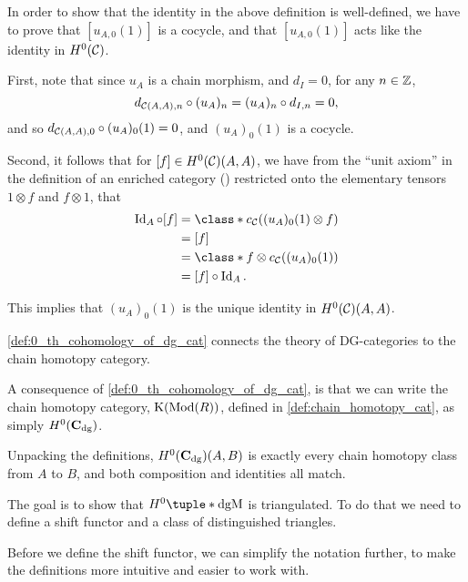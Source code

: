\begin{remark}
    In order to show that the identity in the above definition is well-defined, we have to prove that \( [u_{A, 0} (1)] \) is a cocycle, and that \( [u_{A, 0} (1)] \) acts like the identity in \( H^0({\mathcal{C}}) \).

    First, note that since \( u_A \) is a chain morphism, and \( d_I = 0 \), for any \( n \in {\mathbb{Z}} \),
    \[
        d_{{\mathcal{C}}(A, A), n} \circ (u_A)_n = (u_A)_n \circ d_{I, n} = 0,
    \]
    and so \( d_{{\mathcal{C}}(A, A), 0} \circ (u_A)_0 (1) = 0 \), and \( (u_A)_0 (1) \) is a cocycle.

    Second, it follows that for \( [f] \in H^0({\mathcal{C}})(A, A) \), we have from the ``unit axiom'' in the definition of an enriched category (\cite[Diagram 6.10]{Borceux_1994}) restricted onto the elementary tensors \( 1 \otimes f \) and \( f \otimes 1 \), that
    \begin{align*}
        \Id_A \circ [f] &= \class*{ c_{\Cc}((u_A)_0 (1) \otimes f) } \\
        &= [f] \\
        &= \class*{ f \otimes c_{\Cc}((u_A)_0 (1)) } \\
        &= [f] \circ \Id_A.
    \end{align*}

    This implies that \( (u_A)_0 (1) \) is the unique identity in \( H^0({\mathcal{C}})(A, A) \).
\end{remark}

\autoref{def:0_th_cohomology_of_dg_cat} connects the theory of DG-categories to the chain homotopy category.

\begin{remark}
    \label{rem:c_dg_h_0_is_chain_homotopy_cat}
    A consequence of \autoref{def:0_th_cohomology_of_dg_cat}, is that we can write the chain homotopy category, \( \operatorname{K}(\operatorname{Mod}(R)) \), defined in \autoref{def:chain_homotopy_cat}, as simply \( H^0(\operatorname{\mathbf{C}}_{\operatorname{dg}}) \).
    
    Unpacking the definitions, \( H^0(\operatorname{\mathbf{C}}_{\operatorname{dg}})(A, B) \) is exactly every chain homotopy class from \( A \) to \( B \), and both composition and identities all match.
\end{remark}

The goal is to show that \( H^0\tuple*{\dgM} \) is triangulated. To do that we need to define a shift functor and a class of distinguished triangles.

Before we define the shift functor, we can simplify the notation further, to make the definitions more intuitive and easier to work with.


